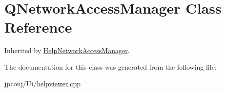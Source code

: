 \hypertarget{class_q_network_access_manager}{}\section{Q\+Network\+Access\+Manager Class Reference}
\label{class_q_network_access_manager}


Inherited by \hyperlink{class_help_network_access_manager}{Help\+Network\+Access\+Manager}.



The documentation for this class was generated from the following file\+:\begin{DoxyCompactItemize}
\item 
jpconj/\+Ui/\hyperlink{helpviewer_8cpp}{helpviewer.\+cpp}\end{DoxyCompactItemize}
